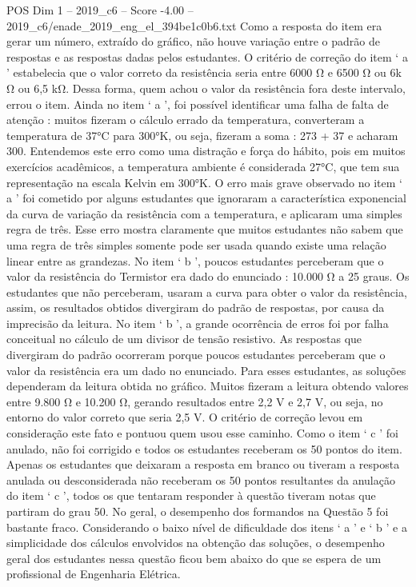 \begin{textsample}{POS Dim 1 – 2019\_c6 – Score -4.00 – 2019\_c6/enade\_2019\_eng\_el\_394be1c0b6.txt}
Como a resposta do item era gerar um número, extraído do gráfico, não houve variação entre o padrão de respostas e as respostas dadas pelos estudantes.
O critério de correção do item ‘ a ’ estabelecia que o valor correto da resistência seria entre 6000 Ω e 6500 Ω ou 6k Ω ou 6,5 kΩ.
Dessa forma, quem achou o valor da resistência fora deste intervalo, errou o item.
Ainda no item ‘ a ’, foi possível identificar uma falha de falta de atenção : muitos fizeram o cálculo errado da temperatura, converteram a temperatura de 37{\EmojiFont °}C para 300{\EmojiFont °}K, ou seja, fizeram a soma : 273 + 37 e acharam 300.
Entendemos este erro como uma distração e força do hábito, pois em muitos exercícios acadêmicos, a temperatura ambiente é considerada 27{\EmojiFont °}C, que tem sua representação na escala Kelvin em 300{\EmojiFont °}K.
O erro mais grave observado no item ‘ a ’ foi cometido por alguns estudantes que ignoraram a característica exponencial da curva de variação da resistência com a temperatura, e aplicaram uma simples regra de três.
Esse erro mostra claramente que muitos estudantes não sabem que uma regra de três simples somente pode ser usada quando existe uma relação linear entre as grandezas.
No item ‘ b ’, poucos estudantes perceberam que o valor da resistência do Termistor era dado do enunciado : 10.000 Ω a 25 graus.
Os estudantes que não perceberam, usaram a curva para obter o valor da resistência, assim, os resultados obtidos divergiram do padrão de respostas, por causa da imprecisão da leitura.
No item ‘ b ’, a grande ocorrência de erros foi por falha conceitual no cálculo de um divisor de tensão resistivo.
As respostas que divergiram do padrão ocorreram porque poucos estudantes perceberam que o valor da resistência era um dado no enunciado.
Para esses estudantes, as soluções dependeram da leitura obtida no gráfico.
Muitos fizeram a leitura obtendo valores entre 9.800 Ω e 10.200 Ω, gerando resultados entre 2,2 V e 2,7 V, ou seja, no entorno do valor correto que seria 2,5 V.
O critério de correção levou em consideração este fato e pontuou quem usou esse caminho.
Como o item ‘ c ’ foi anulado, não foi corrigido e todos os estudantes receberam os 50 pontos do item.
Apenas os estudantes que deixaram a resposta em branco ou tiveram a resposta anulada ou desconsiderada não receberam os 50 pontos resultantes da anulação do item ‘ c ’, todos os que tentaram responder à questão tiveram notas que partiram do grau 50.
No geral, o desempenho dos formandos na Questão 5 foi bastante fraco.
Considerando o baixo nível de dificuldade dos itens ‘ a ’ e ‘ b ’ e a simplicidade dos cálculos envolvidos na obtenção das soluções, o desempenho geral dos estudantes nessa questão ficou bem abaixo do que se espera de um profissional de Engenharia Elétrica.

\end{textsample}
